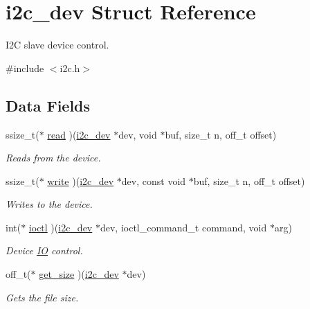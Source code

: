\hypertarget{structi2c__dev}{}\section{i2c\+\_\+dev Struct Reference}
\label{structi2c__dev}


I2C slave device control.  




{\ttfamily \#include $<$i2c.\+h$>$}

\subsection*{Data Fields}
\begin{DoxyCompactItemize}
\item 
ssize\+\_\+t($\ast$ \mbox{\hyperlink{structi2c__dev_a0e86bd425e419806a6a31900ab7d1446}{read}} )(\mbox{\hyperlink{structi2c__dev}{i2c\+\_\+dev}} $\ast$dev, void $\ast$buf, size\+\_\+t n, off\+\_\+t offset)
\begin{DoxyCompactList}\small\item\em Reads from the device. \end{DoxyCompactList}\item 
ssize\+\_\+t($\ast$ \mbox{\hyperlink{structi2c__dev_acfbdecd732f6d4d458c8755c1e0f158d}{write}} )(\mbox{\hyperlink{structi2c__dev}{i2c\+\_\+dev}} $\ast$dev, const void $\ast$buf, size\+\_\+t n, off\+\_\+t offset)
\begin{DoxyCompactList}\small\item\em Writes to the device. \end{DoxyCompactList}\item 
int($\ast$ \mbox{\hyperlink{structi2c__dev_a562c70ebafa483c5946f9c8ecb5011f5}{ioctl}} )(\mbox{\hyperlink{structi2c__dev}{i2c\+\_\+dev}} $\ast$dev, ioctl\+\_\+command\+\_\+t command, void $\ast$arg)
\begin{DoxyCompactList}\small\item\em Device \mbox{\hyperlink{structIO}{IO}} control. \end{DoxyCompactList}\item 
\mbox{\label{structi2c__dev_a558a4d505f719be58efeb70c4dcb4eed}} 
off\+\_\+t($\ast$ \mbox{\hyperlink{structi2c__dev_a558a4d505f719be58efeb70c4dcb4eed}{get\+\_\+size}} )(\mbox{\hyperlink{structi2c__dev}{i2c\+\_\+dev}} $\ast$dev)
\begin{DoxyCompactList}\small\item\em Gets the file size. \end{DoxyCompactList}\item 

\end{DoxyCompactItemize}

